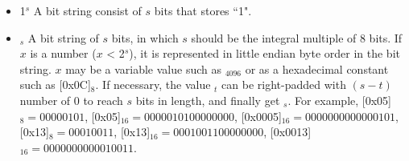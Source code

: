 \documentclass[main\_\_EN.tex]{subfiles}
\begin{document}
\begin{itemize}
\item
1\begin{math}^s\end{math}
\hspace{0.75cm}
A bit string consist of \begin{math}s\end{math} bits that stores ``1".

\item
    \begin{math}[x]_{s}\end{math}  \hspace{0.5cm}
       A bit string of \begin{math}s\end{math} bits, in which \begin{math}s\end{math} should be the integral multiple of 8 bits. If \begin{math}x\end{math} is a number (\begin{math}x\end{math} < 2\begin{math}^s\end{math}), it is represented in little endian byte order in the bit string. \begin{math}x\end{math} may be a variable value such as \begin{math}[Y]_{4096}\end{math} or as a hexadecimal constant such as [0x0C]\begin{math}_{8}\end{math}. If necessary, the value \begin{math}[x]_{t}\end{math} can be right-padded with \begin{math} (s-t) \end{math} number of 0 to reach \begin{math}s\end{math} bits in length, and finally get \begin{math}[x]_{s}\end{math}. For example, [0x05]\begin{math}_{8} = 00000101\end{math},
       [0x05]\begin{math}_{16} = 00000101 00000000\end{math},
       [0x0005]\begin{math}_{16} = 00000000 00000101\end{math},
       [0x13]\begin{math}_{8} = 00010011\end{math},
       [0x13]\begin{math}_{16} = 00010011 00000000\end{math},
       [0x0013]\begin{math}_{16} = 00000000 00010011\end{math}.


\end{itemize}
\end{document}
